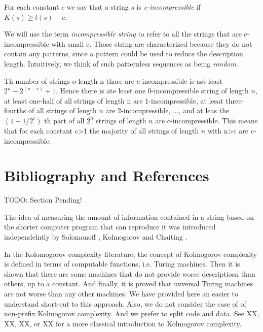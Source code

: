 \begin{definition}
For each constant $c$ we say that a string $s$ is \emph{c-incompressible} if $K(s)\geq l(s)-c$.
\end{definition}

We will use the term \emph{incompressible string} to refer to all the strings that are c-incompressible with small c. Those string are characterized because they do not contain any patterns, since a pattern could be used to reduce the description length. Intuitively, we think of such patternless sequences as being \emph{random}.

Th number of strings o length n thare are c-incompressible is ast least $2^n - 2^(n-c) + 1$. Hence there is ate least one 0-incompressible string of length $n$, at least one-half of all strings of length n are 1-incompressible, at lesat three-fourths of all strings of length $n$ are 2-incompressible, ..., and at leas the $(1-1/2^c)$ th part of all $2^n$ strings of length $n$ are c-incompressible. This means that for each constant c>1 the majority of all strings of length $n$ with n>c are c-incompressible.


%
%

\section*{Bibliography and References}

{\color{red} TODO: Section Pending!}

The idea of measuring the amount of information contained in a string based on the shorter computer program that can reproduce it was introduced independelntly by Solomonoff \cite{solomonoff1964formal}, Kolmogorov \cite{kolmogorov1965three} and Chaiting \cite{chaitin1969simplicity}.

In the Kolomogorov complexity literature, the concept of Kolmogorov complexity is defined in terms of computable functions, i.e. Turing machines. Then it is shown that there are some machines that do not provide worse descriptiosn than others, up to a constant. And finally, it is proved that unversal Turing machines are not worse than any other machines. We have provided here an easier to understand short-cut to this approach. Also, we do not consider the case of of non-prefix Kolmogorov complexity. And we prefer to split code and data. See XX, XX, XX, or XX for a more classical introduction to Kolmogorov complexity.

